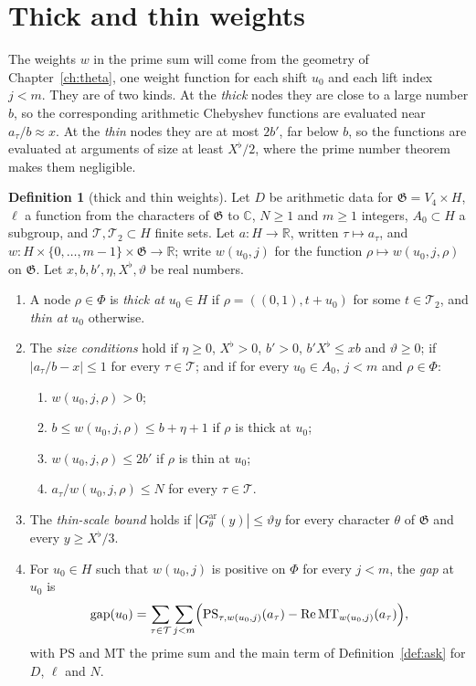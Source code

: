\documentclass[11pt]{amsbook}
\theoremstyle{plain}
\theoremstyle{definition}
\newtheorem{definition}[theorem]{Definition}
\theoremstyle{remark}
\numberwithin{equation}{section}
\numberwithin{figure}{chapter}
\numberwithin{table}{chapter}
\newcommand{\R}{\mathbb{R}}
\renewcommand{\C}{\mathbb{C}}
\newcommand{\GG}{\mathfrak{G}}
\newcommand{\GPsi}{G^{\mathrm{ar}}}
\newcommand{\PS}{\mathrm{PS}}
\newcommand{\MT}{\mathrm{MT}}
\newcommand{\Top}{\mathcal{T}}
\newcommand{\gap}{\operatorname{gap}}
\begin{document}
\section{Thick and thin weights}

The weights $w$ in the prime sum will come from the geometry of
Chapter~\ref{ch:theta}, one weight function for each shift $u_0$ and
each lift index $j<m$. They are of two kinds. At the \emph{thick}
nodes they are close to a large number $b$, so the corresponding
arithmetic Chebyshev functions are evaluated near $a_\tau/b\approx x$.
At the \emph{thin} nodes they are at most $2b'$, far below $b$, so the
functions are evaluated at arguments of size at least $X^\flat/2$,
where the prime number theorem makes them negligible.

\begin{definition}[thick and thin weights]\label{def:thick}
Let $D$ be arithmetic data for $\GG=V_4\times H$, $\ell$ a function
from the characters of $\GG$ to $\C$, $N\ge1$ and $m\ge1$ integers,
$A_0\subset H$ a subgroup, and $\Top,\Top_2\subset H$ finite sets. Let
$a\colon H\to\R$, written $\tau\mapsto a_\tau$, and
$w\colon H\times\{0,\dots,m-1\}\times\GG\to\R$; write $w(u_0,j)$ for
the function $\rho\mapsto w(u_0,j,\rho)$ on $\GG$. Let
$x,b,b',\eta,X^\flat,\vartheta$ be real numbers.
\begin{enumerate}[label=(\arabic*)]
\item A node $\rho\in\Phi$ is \emph{thick at} $u_0\in H$ if
$\rho=((0,1),t+u_0)$ for some $t\in\Top_2$, and \emph{thin at} $u_0$
otherwise.
\item The \emph{size conditions} hold if $\eta\ge0$, $X^\flat>0$,
$b'>0$, $b'X^\flat\le xb$ and $\vartheta\ge0$; if $|a_\tau/b-x|\le1$
for every $\tau\in\Top$; and if for every $u_0\in A_0$, $j<m$ and
$\rho\in\Phi$:
\begin{enumerate}[label=(\alph*)]
\item $w(u_0,j,\rho)>0$;
\item $b\le w(u_0,j,\rho)\le b+\eta+1$ if $\rho$ is thick at $u_0$;
\item $w(u_0,j,\rho)\le2b'$ if $\rho$ is thin at $u_0$;
\item $a_\tau/w(u_0,j,\rho)\le N$ for every $\tau\in\Top$.
\end{enumerate}
\item The \emph{thin-scale bound} holds if
$|\GPsi_\theta(y)|\le\vartheta y$ for every character $\theta$ of
$\GG$ and every $y\ge X^\flat/3$.
\item For $u_0\in H$ such that $w(u_0,j)$ is positive on $\Phi$ for
every $j<m$, the \emph{gap} at $u_0$ is
\[
\gap(u_0)=\sum_{\tau\in\Top}\sum_{j<m}\Bigl(
\PS_{\tau,w(u_0,j)}(a_\tau)-\operatorname{Re}\MT_{w(u_0,j)}(a_\tau)
\Bigr),
\]
with $\PS$ and $\MT$ the prime sum and the main term of
Definition~\ref{def:ask} for $D$, $\ell$ and $N$.
\end{enumerate}
\end{definition}
\end{document}
